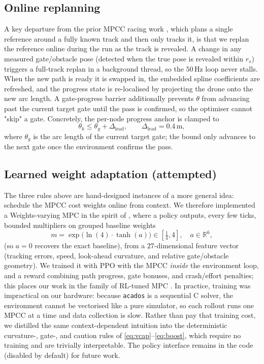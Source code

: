 \documentclass[conference]{IEEEtran}
\begin{document}
\subsection{Online replanning}
A key departure from the prior MPCC racing work
\cite{romero2022mpcc,krinner2024mpccpp}, which plans a single reference around a
fully known track and then only tracks it, is that we replan the reference online
during the run as the track is revealed.
A change in any measured gate/obstacle pose (detected when the true pose is
revealed within $r_s$) triggers a full-track replan in a background thread, so
the $50\,\mathrm{Hz}$ loop never stalls. When the new path is ready it is swapped
in, the embedded spline coefficients are refreshed, and the progress state is
re-localised by projecting the drone onto the new arc length. A gate-progress
barrier additionally prevents $\theta$ from advancing past the current target
gate until the pass is confirmed, so the optimiser cannot "skip" a gate.
Concretely, the per-node progress anchor is clamped to
\begin{equation}
  \theta_k \le \theta_{g} + \Delta_{\mathrm{lead}},\qquad
  \Delta_{\mathrm{lead}}=0.4\,\mathrm{m},
  \label{eq:gatebar}
\end{equation}
where $\theta_{g}$ is the arc length of the current target gate; the bound only
advances to the next gate once the environment confirms the pass.

\subsection{Learned weight adaptation (attempted)}
The three rules above are hand-designed instances of a more general idea:
schedule the MPCC cost weights online from context. We therefore implemented a
Weights-varying MPC in the spirit of \cite{zarrouki2021wmpc}, where a policy
outputs, every few ticks, bounded multipliers on grouped baseline weights
\begin{equation}
  m = \exp\!\big(\ln(4)\cdot\tanh(a)\big)\in[\tfrac14,4],\quad a\in\mathbb{R}^{6},
  \label{eq:mult}
\end{equation}
(so $a=0$ recovers the exact baseline), from a $27$-dimensional feature vector
(tracking errors, speed, look-ahead curvature, and relative gate/obstacle
geometry). We trained it with PPO \cite{schulman2017ppo} with the MPCC
\emph{inside} the environment loop, and a reward combining path progress, gate
bonuses, and crash/effort penalties; this places our work in the family of
RL-tuned MPC \cite{mehndiratta2018,zanon2021rlmpc}. In practice, training was
impractical on our hardware: because \texttt{acados} is a sequential C solver,
the environment cannot be vectorised like a pure simulator, so each rollout runs
one MPCC at a time and data collection is slow. Rather than pay that training
cost, we distilled the same context-dependent intuition into the deterministic
curvature-, gate-, and caution rules of \eqref{eq:vcap}--\eqref{eq:boost}, which
require no training and are trivially interpretable. The policy interface remains
in the code (disabled by default) for future work.
\end{document}
